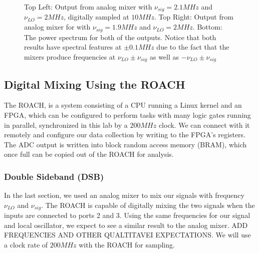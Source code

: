 \documentclass[12pt]{article}
\begin{document}
\begin{figure}[H]
\caption[SODUMB]{Top Left: Output from analog mixer with $\nu_{sig}=2.1MHz$ and $\nu_{LO}=2MHz$, digitally sampled at $10 MHz$. Top Right: Output from analog mixer for with $\nu_{sig}=1.9MHz$ and $\nu_{LO}=2MHz$. Bottom: The power spectrum for both of the outputs. Notice that both results have spectral features at $\pm 0.1 MHz$ due to the fact that the mixers produce frequencies at $\nu_{LO} \pm \nu_{sig}$ as well as $-\nu_{LO} \pm \nu_{sig}$}
\label{fig:analogmixing}
\end{figure}


\subsection*{Digital Mixing Using the ROACH}
The ROACH, is a system consisting of a CPU running a Linux kernel and an FPGA, which can be configured to perform tasks with many logic gates running in parallel, synchronized in this lab by a $200 MHz$ clock. We can connect with it remotely and configure our data collection by writing to the FPGA's registers. The ADC output is written into block random access memory (BRAM), which once full can be copied out of the ROACH for analysis. 

\subsubsection*{Double Sideband (DSB)}
In the last section, we used an analog mixer to mix our signals with frequency $\nu_{LO}$ and $\nu_{sig}$. The ROACH is capable of digitally mixing the two signals when the inputs are connected to ports 2 and 3. Using the same frequencies for our signal and local oscillator, we expect to see a similar result to the analog mixer. ADD FREQUENCIES AND OTHER QUALTITAVEI EXPECTATIONS. We will use a clock rate of $200 MHz$ with the ROACH for sampling.
\end{document}
